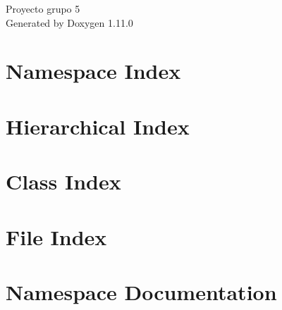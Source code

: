 \documentclass[twoside]{book}
\newcommand{\+}{\discretionary{\mbox{\scriptsize$\hookleftarrow$}}{}{}}
\newcommand{\clearemptydoublepage}{%
    \newpage{\pagestyle{empty}\cleardoublepage}%
  }
\begin{document}
  \raggedbottom
    \hypersetup{pageanchor=false,
                bookmarksnumbered=true,
                pdfencoding=unicode
               }
  \begin{titlepage}
  \vspace*{7cm}
  \begin{center}%
  {\Large Proyecto grupo 5}\\
  \vspace*{1cm}
  {\large Generated by Doxygen 1.11.0}\\
  \end{center}
  \end{titlepage}
  \clearemptydoublepage
  \tableofcontents
  \clearemptydoublepage
  \hypersetup{pageanchor=true}
\chapter{Namespace Index}

\chapter{Hierarchical Index}

\chapter{Class Index}

\chapter{File Index}

\chapter{Namespace Documentation}

\end{document}
